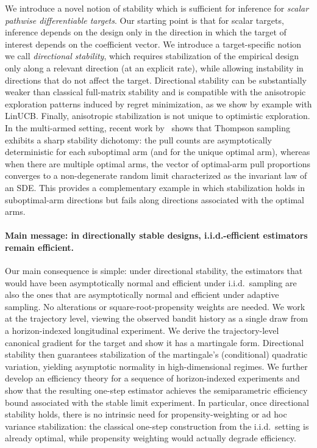\documentclass[11pt]{article}
\begin{document}
We introduce a novel notion of stability which is sufficient for inference for \emph{scalar pathwise differentiable targets}. Our starting point is that for scalar targets, inference depends on the design only in the direction in which the target of interest depends on the coefficient vector. We introduce a target-specific notion we call \emph{directional stability}, which requires stabilization of the empirical design only along a relevant direction (at an explicit rate), while allowing instability in directions that do not affect the target. Directional stability can be substantially weaker than classical full-matrix stability \citep{laiweiaos1982} and is compatible with the anisotropic exploration patterns induced by regret minimization, as we show by example with LinUCB.  Finally, anisotropic stabilization is not unique to optimistic exploration. In the multi-armed setting,
recent work by~\cite{han2026thompson} shows that Thompson sampling exhibits a sharp stability dichotomy:
the pull counts are asymptotically deterministic for each suboptimal arm (and for the unique optimal arm),
whereas when there are multiple optimal arms, the vector of optimal-arm pull proportions converges to a
non-degenerate random limit characterized as the invariant law of an SDE. This provides a complementary
example in which stabilization holds in suboptimal-arm directions but fails along directions associated with
the optimal arms. 

\paragraph{Main message: in directionally stable designs, i.i.d.-efficient estimators remain efficient.}
Our main consequence is simple: under directional stability, the estimators that would have been asymptotically normal and efficient under i.i.d.\ sampling are also the ones that are asymptotically normal and efficient under adaptive sampling. No alterations or square-root-propensity weights are needed. We work at the trajectory level, viewing the observed bandit history as a single draw from a horizon-indexed longitudinal experiment. We derive the trajectory-level canonical gradient for the target and show it has a martingale form. Directional stability then guarantees stabilization of the martingale's (conditional) quadratic variation, yielding asymptotic normality in high-dimensional regimes. We further develop an efficiency theory for a sequence of horizon-indexed experiments and show that the resulting one-step estimator achieves the semiparametric efficiency bound associated with the stable limit experiment. In particular, once directional stability holds, there is no intrinsic need for propensity-weighting or ad hoc variance stabilization: the classical one-step construction from the i.i.d.\ setting is already optimal, while propensity weighting would actually degrade efficiency.
\end{document}
